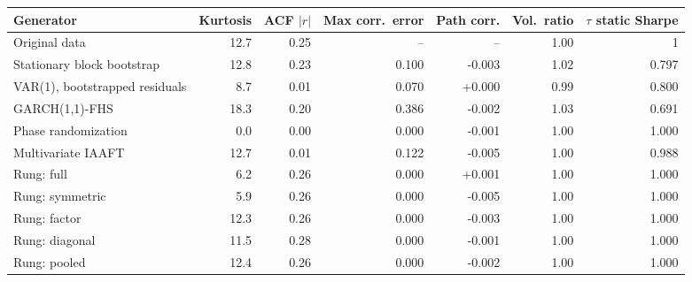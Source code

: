 \begin{tabular}{lrrrrrr}
\toprule
Generator & Kurtosis & ACF $|r|$ & Max corr.\ error & Path corr. & Vol.\ ratio & $\tau$ static Sharpe \\
\midrule
Original data & 12.7 & 0.25 & -- & -- & 1.00 & 1 \\
\midrule
Stationary block bootstrap & 12.8 & 0.23 & 0.100 & -0.003 & 1.02 & 0.797 \\
VAR(1), bootstrapped residuals & 8.7 & 0.01 & 0.070 & +0.000 & 0.99 & 0.800 \\
GARCH(1,1)-FHS & 18.3 & 0.20 & 0.386 & -0.002 & 1.03 & 0.691 \\
Phase randomization & 0.0 & 0.00 & 0.000 & -0.001 & 1.00 & 1.000 \\
Multivariate IAAFT & 12.7 & 0.01 & 0.122 & -0.005 & 1.00 & 0.988 \\
\midrule
Rung: full & 6.2 & 0.26 & 0.000 & +0.001 & 1.00 & 1.000 \\
Rung: symmetric & 5.9 & 0.26 & 0.000 & -0.005 & 1.00 & 1.000 \\
Rung: factor & 12.3 & 0.26 & 0.000 & -0.003 & 1.00 & 1.000 \\
Rung: diagonal & 11.5 & 0.28 & 0.000 & -0.001 & 1.00 & 1.000 \\
Rung: pooled & 12.4 & 0.26 & 0.000 & -0.002 & 1.00 & 1.000 \\
\bottomrule
\end{tabular}